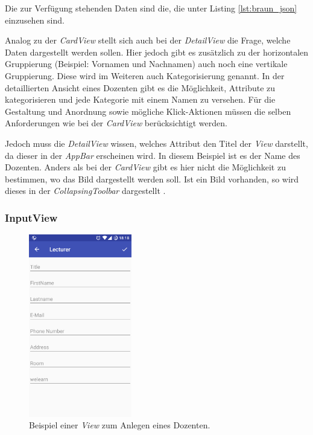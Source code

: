 Die zur Verfügung stehenden Daten sind die, die unter Listing \ref{lst:braun_json} einzusehen sind.

\newpage

Analog zu der \textit{CardView} stellt sich auch bei der \textit{DetailView} die Frage, welche Daten dargestellt werden sollen. Hier jedoch gibt es zusätzlich zu der horizontalen Gruppierung (Beispiel: Vornamen und Nachnamen) auch noch eine vertikale Gruppierung. Diese wird im Weiteren auch Kategorisierung genannt. In der detaillierten Ansicht eines Dozenten gibt es die Möglichkeit, Attribute zu kategorisieren und jede Kategorie mit einem Namen zu versehen. Für die Gestaltung und Anordnung sowie mögliche Klick-Aktionen müssen die selben Anforderungen wie bei der \textit{CardView} berücksichtigt werden. 

Jedoch muss die \textit{DetailView} wissen, welches Attribut den Titel der \textit{View} darstellt, da dieser in der \textit{AppBar} erscheinen wird. In diesem Beispiel ist es der Name des Dozenten. Anders als bei der \textit{CardView} gibt es hier nicht die Möglichkeit zu bestimmen, wo das Bild dargestellt werden soll. Ist ein Bild vorhanden, so wird dieses in der \textit{CollapsingToolbar} dargestellt \cite{collapsing}.

\subsubsection{InputView}

\begin{figure}[H]
	\begin{center}
		\includegraphics[width=0.4\textwidth]{images/input.png}
		\caption{Beispiel einer \textit{View} zum Anlegen eines Dozenten.}
		\label{fig:input}
	\end{center}
\end{figure}

